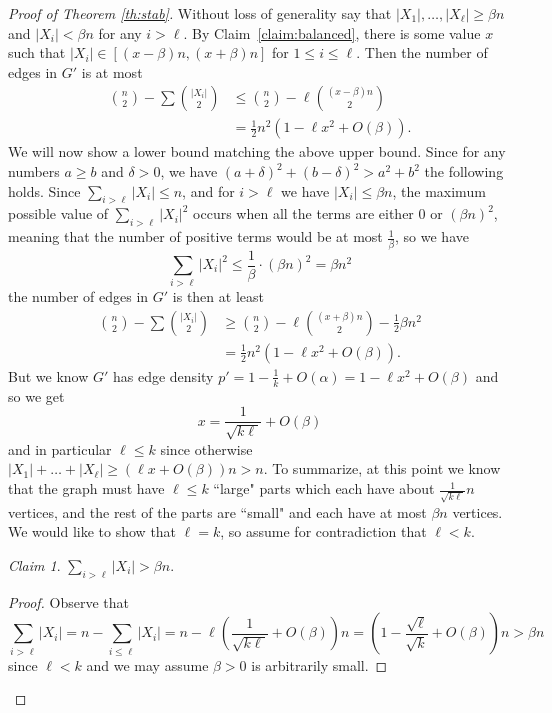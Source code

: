 \documentclass[12pt]{article}
\newcommand{\rbrac}[1]{\left( #1 \right)}
\renewcommand{\a}{\alpha}
\renewcommand{\b}{\beta}
\theoremstyle{definition}
\theoremstyle{remark}
\newtheorem{claim}{Claim}[theorem]
\renewcommand{\ge}{\geqslant}
\renewcommand{\le}{\leqslant}
\begin{document}
\begin{proof}[Proof of Theorem \ref{th:stab}]
Without loss of generality say that $|X_1|, \ldots, |X_\ell| \ge \b n$ and $|X_i| < \b n$ for any $i>\ell$. By Claim~\ref{claim:balanced}, there is some value $x$ such that $|X_i| \in [(x - \b) n, (x + \b) n]$ for $1 \le i \le \ell$. Then the number of edges in $G'$ is at most
\begin{align*}
  \binom{n}{2} - \sum \binom{|X_i|}{2} &\le \binom{n}{2} - \ell \binom{(x-\b) n}{2}\\
  & = \frac12 n^2 (1-\ell x^2 + O\rbrac{ \b}).
 \end{align*}
We will now show a lower bound matching the above upper bound. Since for any numbers $a\ge b$ and $\delta>0$, we have $(a+\delta)^2 + (b-\delta)^2 > a^2+b^2$ the following holds. Since $\sum_{i>\ell} |X_i| \le n$, and for $i > \ell$ we have $|X_i| \le \b n$, the maximum possible value of $\sum_{i>\ell} |X_i|^2$ occurs when all the terms are either $0$ or $(\b n)^2$, meaning that the number of positive terms would be at most $\frac{1}{\b }$, so we have 
\[
\sum_{i>\ell} |X_i|^2 \le \frac{1}{\b } \cdot (\b n)^2 = \b n^2
\]
 the number of edges in $G'$ is then at least
\begin{align*}
  \binom{n}{2} - \sum \binom{|X_i|}{2} &\ge \binom{n}{2} - \ell \binom{(x+\b) n}{2} -\frac12 \b n^2\\
    & = \frac12 n^2 (1-\ell x^2 +O(\b) ).
 \end{align*}
But we know $G'$ has edge density $p' = 1 - \frac1k + O(\a)=1-\ell x^2 +O(\b)$ and so we get 
\[
x=\frac{1}{\sqrt{k\ell}} + O(\b)
\]
and in particular $\ell \le k$ since otherwise $|X_1| + \ldots + |X_\ell| \ge (\ell x + O(\b))n > n$. To summarize, at this point we know that the graph must have $\ell \le k$ ``large" parts which each have about $\frac{1}{\sqrt{k\ell}} n$ vertices, and the rest of the parts are ``small" and each have at most $\b n$ vertices. We would like to show that $\ell = k$, so assume for contradiction that $\ell < k$. 
\begin{claim}
$\sum_{i > \ell} |X_i| > \b n$.
\end{claim}
\begin{proof}
Observe that 
\[
\sum_{i > \ell} |X_i| = n-\sum_{i \le \ell} |X_i|= n-\ell\rbrac{\frac{1}{\sqrt{k\ell}} + O(\b)}n = \rbrac{1-\frac{\sqrt{\ell}}{\sqrt{k}}+O(\b)}n > \b n
\]
since $\ell < k$ and we may assume $\b>0$ is arbitrarily small. 
\end{proof} 



\end{proof}
\end{document}
